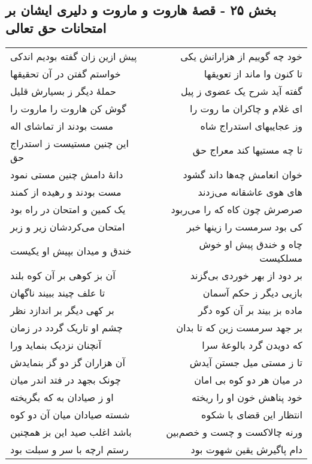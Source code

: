 \begin{center}
\section*{بخش ۲۵ - قصهٔ هاروت و ماروت و دلیری  ایشان بر امتحانات حق تعالی}
\label{sec:sh025}
\begin{longtable}{l p{0.5cm} r}
پیش ازین زان گفته بودیم اندکی
&&
خود چه گوییم از هزارانش یکی
\\
خواستم گفتن در آن تحقیقها
&&
تا کنون وا ماند از تعویقها
\\
حملهٔ دیگر ز بسیارش قلیل
&&
گفته آید شرح یک عضوی ز پیل
\\
گوش کن هاروت را ماروت را
&&
ای غلام و چاکران ما روت را
\\
مست بودند از تماشای اله
&&
وز عجایبهای استدراج شاه
\\
این چنین مستیست ز استدراج حق
&&
تا چه مستیها کند معراج حق
\\
دانهٔ دامش چنین مستی نمود
&&
خوان انعامش چه‌ها داند گشود
\\
مست بودند و رهیده از کمند
&&
های هوی عاشقانه می‌زدند
\\
یک کمین و امتحان در راه بود
&&
صرصرش چون کاه که را می‌ربود
\\
امتحان می‌کردشان زیر و زبر
&&
کی بود سرمست را زینها خبر
\\
خندق و میدان بپیش او یکیست
&&
چاه و خندق پیش او خوش مسلکیست
\\
آن بز کوهی بر آن کوه بلند
&&
بر دود از بهر خوردی بی‌گزند
\\
تا علف چیند ببیند ناگهان
&&
بازیی دیگر ز حکم آسمان
\\
بر کهی دیگر بر اندازد نظر
&&
ماده بز بیند بر آن کوه دگر
\\
چشم او تاریک گردد در زمان
&&
بر جهد سرمست زین که تا بدان
\\
آنچنان نزدیک بنماید ورا
&&
که دویدن گرد بالوعهٔ سرا
\\
آن هزاران گز دو گز بنمایدش
&&
تا ز مستی میل جستن آیدش
\\
چونک بجهد در فتد اندر میان
&&
در میان هر دو کوه بی امان
\\
او ز صیادان به که بگریخته
&&
خود پناهش خون او را ریخته
\\
شسته صیادان میان آن دو کوه
&&
انتظار این قضای با شکوه
\\
باشد اغلب صید این بز همچنین
&&
ورنه چالاکست و چست و خصم‌بین
\\
رستم ارچه با سر و سبلت بود
&&
دام پاگیرش یقین شهوت بود
\\

\end{longtable}
\end{center}
